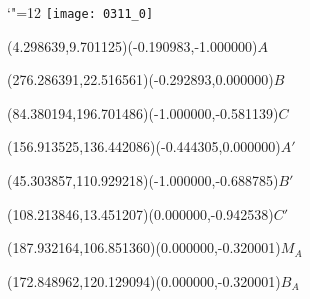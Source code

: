 \documentclass[12pt]{article}
\begin{document}
\makeatletter%
\let\ASYencoding\f@encoding%
\let\ASYfamily\f@family%
\let\ASYseries\f@series%
\let\ASYshape\f@shape%
\makeatother%
{\catcode`"=12%
\texttt{[image: 0311\_0]}%
}%
\kern -284.527559pt%
%
%
\fontsize{12.000000}{14.400000}\selectfont%
\usefont{\ASYencoding}{\ASYfamily}{\ASYseries}{\ASYshape}%
\ASYalign(4.298639,9.701125)(-0.190983,-1.000000){$A$}%
%
%
\fontsize{12.000000}{14.400000}\selectfont%
\ASYalign(276.286391,22.516561)(-0.292893,0.000000){$B$}%
%
%
\fontsize{12.000000}{14.400000}\selectfont%
\ASYalign(84.380194,196.701486)(-1.000000,-0.581139){$C$}%
%
%
\fontsize{12.000000}{14.400000}\selectfont%
\ASYalign(156.913525,136.442086)(-0.444305,0.000000){$A'$}%
%
%
\fontsize{12.000000}{14.400000}\selectfont%
\ASYalign(45.303857,110.929218)(-1.000000,-0.688785){$B'$}%
%
%
\fontsize{12.000000}{14.400000}\selectfont%
\ASYalign(108.213846,13.451207)(0.000000,-0.942538){$C'$}%
%
%
\fontsize{12.000000}{14.400000}\selectfont%
\ASYalign(187.932164,106.851360)(0.000000,-0.320001){$M_A$}%
%
%
\fontsize{12.000000}{14.400000}\selectfont%
\ASYalign(172.848962,120.129094)(0.000000,-0.320001){$B_A$}%
\end{document}
